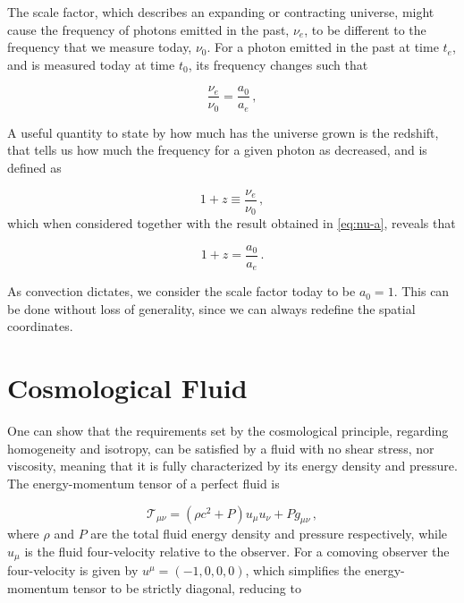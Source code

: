 The scale factor, which describes an expanding or contracting universe, might cause the frequency of photons emitted in the past, $\nu_e$, to be different to the frequency that we measure today, $\nu_0$. For a photon emitted in the past at time $t_e$, and is measured today at time $t_0$, its frequency changes such that

\begin{equation}
    \label{eq:nu-a}
    \frac{\nu_e}{\nu_0} = \frac{a_0}{a_e} \,,
\end{equation}

A useful quantity to state by how much has the universe grown is the redshift, that tells us how much the frequency for a given photon as decreased, and is defined as

\begin{equation}
    1 + z \equiv \frac{\nu_e}{\nu_0} \,,
\end{equation}
which when considered together with the result obtained in \cref{eq:nu-a}, reveals that

\begin{equation}
    1 + z = \frac{a_0}{a_e} \,.
\end{equation}

As convection dictates, we consider the scale factor today to be $a_0 = 1$. This can be done without loss of generality, since we can always redefine the spatial coordinates.


\section{Cosmological Fluid}
\label{sec:cosmological-fluid}

One can show that the requirements set by the cosmological principle, regarding homogeneity and isotropy, can be satisfied by a fluid with no shear stress, nor viscosity, meaning that it is fully characterized by its energy density and pressure. The energy-momentum tensor of a perfect fluid is

\begin{equation}
    \mathcal{T}_{\mu \nu} = (\rho c^2 + P) u_\mu u_\nu + P g_{\mu \nu} \,,
\end{equation}
where $\rho$ and $P$ are the total fluid energy density and pressure respectively, while $u_\mu$ is the fluid four-velocity relative to the observer. For a comoving observer the four-velocity is given by $u^\mu = (-1, 0, 0, 0)$, which simplifies the energy-momentum tensor to be strictly diagonal, reducing to


